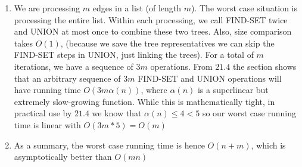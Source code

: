 \documentclass[11pt]{article}
\begin{document}
\begin{solution}
\begin{enumerate}
  \item We are processing $m$ edges in a list (of length $m$). The worst case situation is processing the entire list. Within each processing, we call FIND-SET twice and UNION at most once to combine these two trees. Also, size comparison takes $O(1)$, (because we save the tree representatives we can skip the FIND-SET steps in UNION, just linking the trees). For a total of $m$ iterations, we have a sequence of $3m$ operations. From $21.4$ the section shows that an arbitrary sequence of $3m$ FIND-SET and UNION operations will have running time $O(3m \alpha(n))$,  where $\alpha(n)$ is a superlinear but extremely slow-growing function. While this is mathematically tight, in practical use by $21.4$ we know that $\alpha(n) \leq 4 < 5$ so our worst case running time is linear with $O(3m * 5) = O(m)$
  \item As a summary, the worst case running time is hence $O(n + m)$, which is asymptotically better than $O(mn)$
\end{enumerate}
\end{solution}
\end{document}
